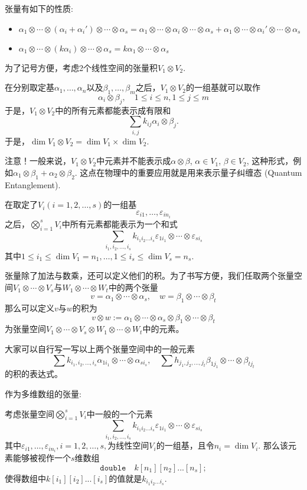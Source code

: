 张量有如下的性质:
\begin{itemize}
\item $\alpha_1\otimes\cdots\otimes(\alpha_i+\alpha_i')\otimes\cdots\otimes\alpha_s = \alpha_1\otimes\cdots\otimes\alpha_i\otimes\cdots\otimes\alpha_s + \alpha_1\otimes\cdots\otimes\alpha_i'\otimes\cdots\otimes\alpha_s$
\item $\alpha_1\otimes\cdots\otimes(k\alpha_i)\otimes\cdots\otimes\alpha_s = k \alpha_1\otimes\cdots\otimes\alpha_s$
\end{itemize}

为了记号方便，考虑2个线性空间的张量积$V_1\otimes V_2$.

在分别取定基$\alpha_1,\ldots,\alpha_n$以及$\beta_1,\ldots,\beta_m$之后，$V_1\otimes V_2$的一组基就可以取作
$$\alpha_i\otimes \beta_j, \quad 1\leqslant i\leqslant n, 1\leqslant j\leqslant m$$
于是，$V_1\otimes V_2$中的所有元素都能表示成有限和
$$\sum\limits_{i,j} k_{ij} \alpha_i\otimes \beta_j.$$
于是，$\dim V_1\otimes V_2 = \dim V_1 \times \dim V_2.$

{\color{red}注意}！一般来说，$V_1\otimes V_2$中元素并不能表示成$\alpha\otimes\beta$, $\alpha\in V_1$, $\beta\in V_2$, 这种形式，例如$\alpha_1\otimes \beta_1 + \alpha_2\otimes\beta_2$. 这点在物理中的重要应用就是用来表示量子纠缠态 (Quantum Entanglement).

在取定了$V_i (i=1,2,\ldots,s)$的一组基
$$\varepsilon_{i1},\ldots,\varepsilon_{in_i}$$
之后，$\bigotimes\limits_{i=1}^s V_i$中所有元素都能表示为一个和式
$$\sum\limits_{i_1,i_2,\ldots,i_s} k_{i_1i_2\ldots i_s} \varepsilon_{1i_1} \otimes \cdots \otimes \varepsilon_{si_s}$$
其中$1\leqslant i_1\leqslant \dim V_1 = n_1, \ldots, 1\leqslant i_s\leqslant \dim V_s = n_s$.

张量除了加法与数乘，还可以定义他们的积。为了书写方便，我们任取两个张量空间$V_1\otimes\cdots\otimes V_s$与$W_1\otimes\cdots\otimes W_t$中的两个张量
$$v = \alpha_1\otimes\cdots\otimes \alpha_s, \quad w = \beta_1\otimes\cdots\otimes \beta_t$$
那么可以定义$v$与$w$的积为
$$v\otimes w := \alpha_1\otimes\cdots\otimes \alpha_s \otimes \beta_1\otimes\cdots\otimes \beta_t$$
为张量空间$V_1\otimes\cdots\otimes V_s\otimes W_1\otimes\cdots\otimes W_t$中的元素。

大家可以自行写一写以上两个张量空间中的一般元素
$$\sum k_{i_1,i_2,\ldots,i_s}\alpha_{1i_1} \otimes \cdots \otimes \alpha_{si_s}, \quad \sum h_{j_1,j_2,\ldots,j_t}\beta_{1j_1} \otimes \cdots \otimes \beta_{tj_t}$$
的积的表达式。

作为多维数组的张量:

考虑张量空间$\bigotimes\limits_{i=1}^s V_i$中一般的一个元素
$$\sum\limits_{i_1,i_2,\ldots,i_s} k_{i_1i_2\ldots i_s} \varepsilon_{1i_1} \otimes \cdots \otimes \varepsilon_{si_s}$$
其中$\varepsilon_{i1},\ldots,\varepsilon_{in_i}, i=1,2,\ldots,s,$为线性空间$V_i $的一组基，且令$n_i = \dim V_i$. 那么该元素能够被视作一个$s$维数组
$$
\texttt{double} \quad k[n_1][n_2]...[n_s];
$$
使得数组中$k[i_1][i_2]...[i_s]$的值就是$k_{i_1i_2\ldots i_s}$.


